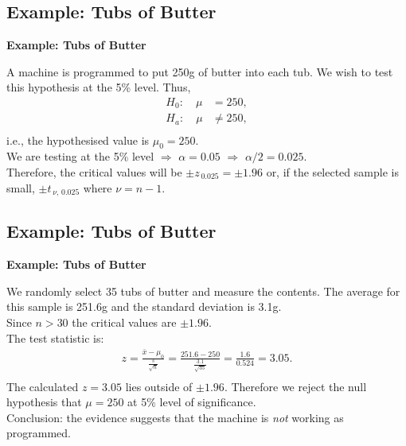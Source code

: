 \documentclass[compress]{beamer}        %
\makeatletter
\newcommand{\tcb}{\textcolor{beamer@blendedblue}}
\makeatother
\begin{document}
\subsection{Example: Tubs of Butter}
\begin{frame}{\bf \tcb{Example: Tubs of Butter}}

A machine is programmed to put 250g of butter into each tub. We wish to test this hypothesis at the 5\% level. Thus,\\[-0.2cm]
\begin{align*}
H_0: \quad \mu &= 250,\\
H_a: \quad \mu &\ne 250,\\[-0.2cm]
\end{align*}
i.e., the hypothesised value is $\mu_0 = 250$.\\[0.8cm]

We are testing at the 5\% level $\Rightarrow$ $\alpha = 0.05$ $\Rightarrow$ $\alpha/2 = 0.025$.\\[0.8cm]

Therefore, the critical values will be $\pm z_{\,0.025} = \pm 1.96$ or, if the selected sample is small, $\pm t_{\,\nu,\,0.025}$ where $\nu = n - 1$.

\end{frame}


\subsection{Example: Tubs of Butter}
\begin{frame}{\bf \tcb{Example: Tubs of Butter}}

We randomly select 35 tubs of butter and measure the contents. The average for this sample is 251.6g and the standard deviation is 3.1g.\\[0.6cm]

Since $n > 30$ the critical values are $\pm 1.96$.\\[0.6cm]

The test statistic is:
\begin{align*}
z =  \frac{\bar x - \mu_0}{\frac{s}{\sqrt{n}}} = \frac{251.6 - 250}{\frac{3.1}{\sqrt{35}}} = \frac{1.6}{0.524} = 3.05.\\
\end{align*}
The calculated $z = 3.05$ lies outside of $\pm 1.96$. Therefore we reject the null hypothesis that $\mu = 250$ at 5\% level of significance.\\[0.4cm]

Conclusion: the evidence suggests that the machine is \emph{not} working as programmed.


\end{frame}
\end{document}
